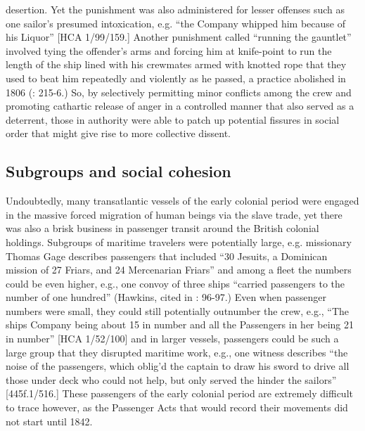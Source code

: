 desertion.  Yet the punishment was also administered for lesser offenses such as one sailor’s presumed intoxication, e.g. “the Company whipped him because of his Liquor” [HCA 1/99/159.] Another punishment called “running the gauntlet” involved tying the offender’s arms and forcing him at knife-point to run the length of the ship lined with his crewmates armed with knotted rope that they used to beat him repeatedly and violently as he passed, a practice abolished in 1806 (\citealt{AdkinsAdkins2008}: 215-6.) So, by selectively permitting minor conflicts among the crew and promoting cathartic release of anger in a controlled manner that also served as a deterrent, those in authority were able to patch up potential fissures in social order that might give rise to more collective dissent. 

\subsection{{Subgroups} {and} {social} {cohesion}}%

  Undoubtedly, many transatlantic vessels of the early colonial period were engaged in the massive forced migration of human beings via the slave trade, yet there was also a brisk business in passenger transit around the British colonial holdings. Subgroups of maritime travelers were potentially large, e.g. missionary Thomas Gage describes passengers that included “30 Jesuits, a Dominican mission of 27 Friars, and 24 Mercenarian Friars” \citep[15,]{Gage1648} and among a fleet the numbers could be even higher, e.g., one convoy of three ships “carried passengers to the number of one hundred” (Hawkins, cited in \citealt{Bicheno2012}: 96-97.) Even when passenger numbers were small, they could still potentially outnumber the crew, e.g., “The ships Company being about 15 in number and all the Passengers in her being 21 in number” [HCA 1/52/100] and in larger vessels, passengers could be such a large group that they disrupted maritime work, e.g., one witness describes “the noise of the passengers, which oblig’d the captain to draw his sword to drive all those under deck who could not help, but only served the hinder the sailors” [445f.1/516.] These passengers of the early colonial period are extremely difficult to trace however, as the Passenger Acts that would record their movements did not start until 1842.

